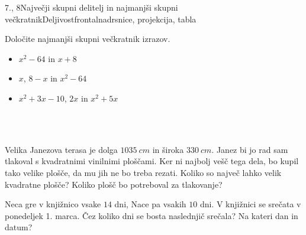 \begin{priprava}{7., 8}{}{Največji skupni delitelj in najmanjši skupni večkratnik}{Deljivost}{frontalna}{drsnice, projekcija, tabla}
\begin{multicols}{2}
\begin{naloga}
    Določite najmanjši skupni večkratnik izrazov.
    \begin{itemize}
        \item $x^2-64$ in $x+8$ 
        \item $x$, $8-x$ in $x^2-64$ 
        \item $x^2+3x-10$, $2x$ in $x^2+5x$ 
    \end{itemize}
\end{naloga}
~\\~\\
\end{multicols}

\begin{naloga}
    Velika Janezova terasa je dolga $1035~cm$ in široka $330~cm$. Janez bi jo rad sam tlakoval s kvadratnimi vinilnimi ploščami.
    Ker ni najbolj vešč tega dela, bo kupil tako velike plošče, da mu jih ne bo treba rezati.
    Koliko so največ lahko velik kvadratne plošče? Koliko plošč bo potreboval za tlakovanje? 
\end{naloga}

\begin{naloga}
    Neca gre v knjižnico vsake $14$ dni, Nace pa vsakih $10$ dni. V knjižnici se srečata v ponedeljek 1. marca.
    Čez koliko dni se bosta naslednjič srečala? Na kateri dan in datum?                     
\end{naloga}

        
            
 


\end{priprava}